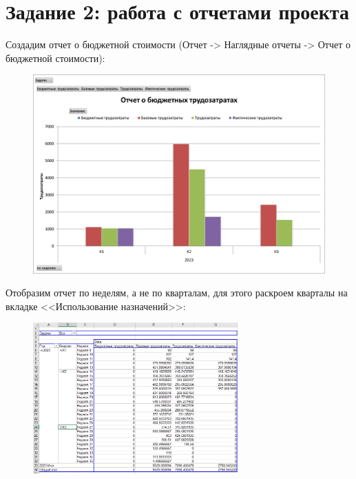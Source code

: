 \section*{Задание 2: работа с отчетами проекта}

Создадим отчет о бюджетной стоимости (Отчет -> Наглядные отчеты -> Отчет о бюджетной стоимости):

\begin{figure}[H]
	\begin{center}
		\includegraphics[width=\textwidth]{imgs/task_2_0.png}
	\end{center}
\end{figure}

Отобразим отчет по неделям, а не по кварталам, для этого раскроем кварталы на вкладке <<Использование назначений>>:

\begin{figure}[H]
	\begin{center}
		\includegraphics[width=0.7\textwidth]{imgs/task_2_1.png}
	\end{center}
\end{figure}


